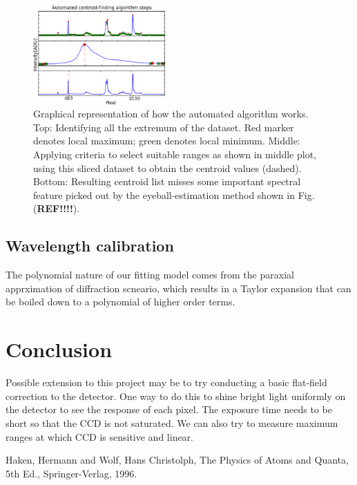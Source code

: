 \documentclass[authoryear, 12pt,5p, times]{elsarticle}
\begin{document}
\begin{figure}
\includegraphics[width=0.45\textwidth]{figures/steps}
\caption{Graphical representation of how the automated algorithm works. Top: Identifying all the extremum of the dataset. Red marker denotes local maximum; green denotes local minimum. Middle: Applying criteria to select suitable ranges as shown in middle plot, using this sliced dataset to obtain the centroid values (dashed). Bottom: Resulting centroid list misses some important spectral feature picked out by the eyeball-estimation method shown in Fig. (\textbf{REF!!!!}).} 
\end{figure}
\subsection{Wavelength calibration}
The polynomial nature of our fitting model comes from the paraxial apprximation of diffraction scneario, which results in a Taylor expansion that can be boiled down to a polynomial of higher order terms.
\section{Conclusion}
Possible extension to this project may be to try conducting a basic flat-field correction to the detector. One way to do this to shine bright light uniformly on the detector to see the response of each pixel.  The exposure time needs to be short so that the CCD is not saturated. We can also try to measure maximum ranges at which CCD is sensitive and linear.

%
%
%

Haken, Hermann and Wolf, Hans Christolph, The Physics of Atoms and Quanta, 5th Ed., Springer-Verlag, 1996.
\end{document}
